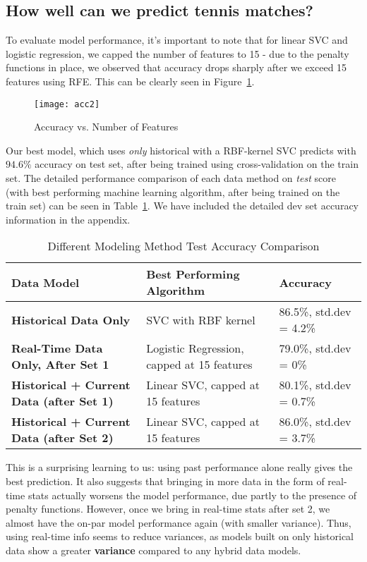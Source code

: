 \documentclass[paper=a4, fontsize=10pt]{scrartcl} %
\numberwithin{equation}{section} %
\numberwithin{figure}{section} %
\numberwithin{table}{section} %
\begin{document}
\subsection{How well can we predict tennis matches?}
To evaluate model performance, it's important to note that for linear SVC and logistic regression, we capped the number of features to 15 - due to the penalty functions in place, we observed that accuracy drops sharply after we exceed 15 features using RFE. This can be clearly seen in Figure~\ref{fig:rfe}. 
\begin{figure}[h]
\caption{Accuracy vs. Number of Features}
  \label{fig:rfe}
  \centering
    \texttt{[image: acc2]}
\end{figure}
Our best model, which uses \textit{only} historical with a RBF-kernel SVC predicts with $94.6\%$ accuracy on test set, after being trained using cross-validation on the train set. The detailed performance comparison of each data method on \textit{test} score (with best performing machine learning algorithm, after being trained on the train set) can be seen in Table~\ref{tab:m1}. We have included the detailed dev set accuracy information in the appendix. 
\begin{table}[h]
\caption{Different Modeling Method Test Accuracy Comparison}
\label{tab:m1}
\begin{tabular}{ p{2.5cm} | p{2.5cm} | p{2cm}}
    \hline
    \textbf{Data Model} & \textbf{Best Performing Algorithm} & \textbf{Accuracy}  \\ \hline
   \textbf{Historical Data Only} &  SVC with RBF kernel & 86.5\%, std.dev = 4.2\%  \\ \hline
   \textbf{Real-Time Data Only, After Set 1} & Logistic Regression, capped at 15 features & 79.0\%, std.dev = 0\%  \\ \hline
   \textbf{Historical + Current Data (after Set 1)} &  Linear SVC, capped at 15 features & 80.1\%, std.dev = 0.7\%  \\ \hline
   \textbf{Historical + Current Data (after Set 2)} &  Linear SVC, capped at 15 features & 86.0\%, std.dev = 3.7\% \\ \hline
\end{tabular}
\end{table}
This is a surprising learning to us: using past performance alone really gives the best prediction. It also suggests that bringing in more data in the form of real-time stats actually worsens the model performance, due partly to the presence of penalty functions. However, once we bring in real-time stats after set 2, we almost have the on-par model performance again (with smaller variance). Thus, using real-time info seems to reduce variances, as models built on only historical data show a greater \textbf{variance} compared to any hybrid data models. 
\end{document}
